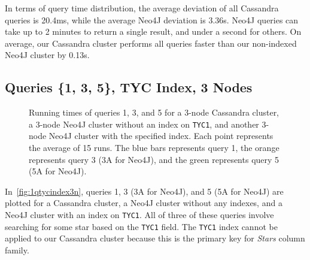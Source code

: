 In terms of query time distribution, the average deviation of all Cassandra queries is 20.4ms, while the average Neo4J
deviation is 3.36s.
Neo4J queries can take up to 2 minutes to return a single result, and under a second for others.
On average, our Cassandra cluster performs all queries faster than our non-indexed Neo4J cluster by 0.13s.

\subsection{Queries \{1, 3, 5\}, TYC Index, 3 Nodes}\label{subsec:queries135TycIndex3Nodes}
\begin{figure}
    \caption{Running times of queries 1, 3, and 5 for a 3-node Cassandra cluster, a 3-node Neo4J cluster without an
    index on \texttt{TYC1}, and another 3-node Neo4J cluster with the specified index.
    Each point represents the average of 15 runs.
    The blue bars represents query 1, the orange represents query 3 (3A for Neo4J), and the green represents query 5
    (5A for Neo4J).}\label{fig:1qtycindex3n}
\end{figure}

In~\autoref{fig:1qtycindex3n}, queries 1, 3 (3A for Neo4J), and 5 (5A for Neo4J) are plotted for a Cassandra cluster,
a Neo4J cluster without any indexes, and a Neo4J cluster with an index on \texttt{TYC1}.
All of three of these queries involve searching for some star based on the \texttt{TYC1} field.
The \texttt{TYC1} index cannot be applied to our Cassandra cluster because this is the primary key for \textit{Stars}
column family.

